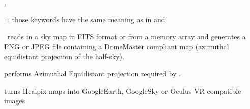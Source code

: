 \begin{keywords}
\begin{kwlist}{}
\item [\mytarget{idl:hpx2dm:other_keywords}
\mylink{idl:mollview:asinh}{/ASINH}, ]
%
\item [\mylink{idl:mollview:colt}{COLT}=,
\mylink{idl:mollview:coord}{COORD}=,
\mylink{idl:mollview:factor}{FACTOR}=,
\mylink{idl:mollview:flip}{/FLIP},
\mylink{idl:mollview:hbound}{HBOUND}=,]
%
\item [\mylink{idl:mollview:hist_equal}{/HIST\_EQUAL},
\mylink{idl:mollview:log}{/LOG},
\mylink{idl:mollview:max}{MAX}=,
\mylink{idl:mollview:min}{MIN}=, %
\mylink{idl:mollview:nested}{/NESTED},
\mylink{idl:mollview:offset}{OFFSET}=, ]
%
\item [%
/QUADCUBE,
\mylink{idl:mollview:rot}{ROT}=,
\mylink{idl:mollview:save}{SAVE}=,
\mylink{idl:mollview:silent}{/SILENT}, ]
%
\item [\mylink{idl:mollview:truecolors}{TRUECOLORS}=]
 those keywords have the same meaning as in
 and 


  \end{kwlist}
\end{keywords}


\begin{codedescription}
{\thedocid\ reads in a \healpix sky map in FITS format or from a memory array
and generates a PNG or JPEG file containing a DomeMaster compliant map
(azimuthal equidistant projection of the half-sky).%
}
\end{codedescription}

%
\begin{related}
  \begin{sulist}{} %
  \item[\htmlref{azeqview}{idl:azeqview}] performs Azimuthal Equidistant
projection required by \thedocid.
  \item[\htmlref{hpx2gs}{idl:hpx2gs}] turns Healpix maps into GoogleEarth,
GoogleSky or Oculus VR compatible images
  \end{sulist}
\end{related}


